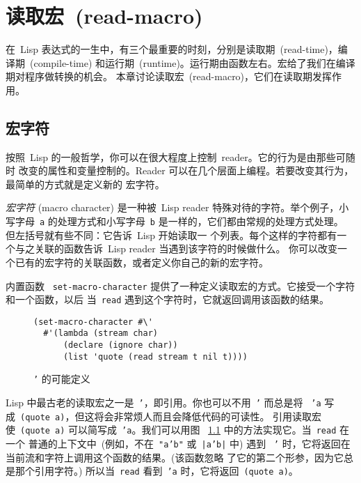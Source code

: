 
\chapter{读取宏~(read-macro)}
\label{chap:read-macros}

在~Lisp 表达式的一生中，有三个最重要的时刻，分别是读取期~(read-time)，编译期~(compile-time)
和运行期~(runtime)。运行期由函数左右。宏给了我们在编译期对程序做转换的机会。
本章讨论读取宏~(read-macro)，它们在读取期发挥作用。

\section{宏字符}
\label{sec:macro_characters}

按照~Lisp 的一般哲学，你可以在很大程度上控制~reader。它的行为是由那些可随时
改变的属性和变量控制的。Reader 可以在几个层面上编程。若要改变其行为，最简单的方式就是定义新的
宏字符。

\emph{宏字符} (macro character) 是一种被~Lisp reader 特殊对待的字符。举个例子，小写字母~\texttt{a}
的处理方式和小写字母~\texttt{b} 是一样的，它们都由常规的处理方式处理。
但左括号就有些不同：它告诉~Lisp 开始读取一
个列表。每个这样的字符都有一个与之关联的函数告诉~Lisp reader 当遇到该字符的时候做什么。
你可以改变一个已有的宏字符的关联函数，或者定义你自己的新的宏字符。

内置函数
~\texttt{set-macro-character}
提供了一种定义读取宏的方式。它接受一个字符和一个函数，以后
当~\texttt{read} 遇到这个字符时，它就返回调用该函数的结果。

\begin{figure}
\begin{lstlisting}
(set-macro-character #\'
  #'(lambda (stream char)
      (declare (ignore char))
      (list 'quote (read stream t nil t))))
\end{lstlisting}
  \caption{\texttt{'} 的可能定义}
  \label{fig:possible_definition_of_quote}
\end{figure}

Lisp 中最古老的读取宏之一是~\texttt{'}，即引用。你也可以不用~\texttt{'} 而总是将
~\texttt{'a} 写成~\texttt{(quote a)}，但这将会非常烦人而且会降低代码的可读性。
引用读取宏使~\texttt{(quote a)} 可以简写成~\texttt{'a}。我们可以用图
~\ref{fig:possible_definition_of_quote} 中的方法实现它。当~\texttt{read} 在一个
普通的上下文中~(例如，不在~\texttt{"a'b"} 或~\texttt{|a'b|} 中) 遇到
~\texttt{'} 时，它将返回在当前流和字符上调用这个函数的结果。(该函数忽略
了它的第二个形参，因为它总是那个引用字符。) 所以当~\texttt{read} 看到~\texttt{'a} 时，它将返回~\texttt{(quote a)}。

